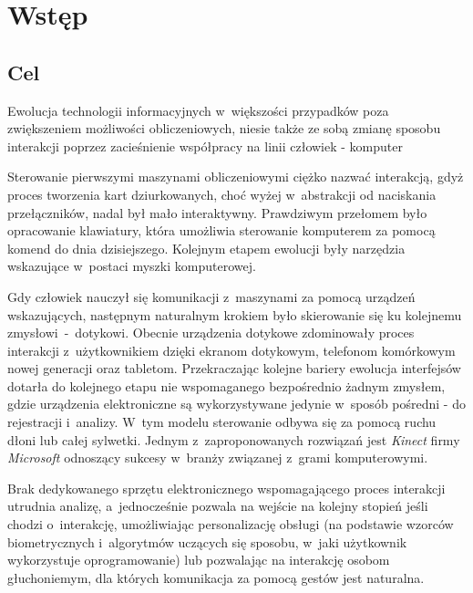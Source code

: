 \chapter{Wstęp}\label{Chapter_Wstep}

  \section{Cel}\label{Section_Aim}

    Ewolucja technologii informacyjnych w~większości przypadków poza zwiększeniem możliwości obliczeniowych, niesie także ze sobą zmianę sposobu interakcji poprzez zacieśnienie współpracy na linii człowiek - komputer

    Sterowanie pierwszymi maszynami obliczeniowymi ciężko nazwać interakcją, gdyż proces tworzenia kart dziurkowanych, choć wyżej w~abstrakcji od naciskania przełączników, nadal był mało interaktywny. Prawdziwym przełomem było opracowanie klawiatury, która umożliwia sterowanie komputerem za pomocą komend do dnia dzisiejszego. Kolejnym etapem ewolucji były narzędzia wskazujące w~postaci myszki komputerowej.

    Gdy człowiek nauczył się komunikacji z~maszynami za pomocą urządzeń wskazujących, następnym naturalnym krokiem było skierowanie się ku kolejnemu zmysłowi~-~dotykowi. Obecnie urządzenia dotykowe zdominowały proces interakcji z~użytkownikiem dzięki ekranom dotykowym, telefonom komórkowym nowej generacji oraz tabletom. Przekraczając kolejne bariery ewolucja interfejsów dotarła do kolejnego etapu nie wspomaganego bezpośrednio żadnym zmysłem, gdzie urządzenia elektroniczne są wykorzystywane jedynie w~sposób pośredni - do rejestracji i~analizy. W~tym modelu sterowanie odbywa się za pomocą ruchu dłoni lub całej sylwetki. Jednym z~zaproponowanych rozwiązań jest \textit{Kinect} firmy \textit{Microsoft} odnoszący sukcesy w~branży związanej z~grami komputerowymi.

    Brak dedykowanego sprzętu elektronicznego wspomagającego proces interakcji utrudnia analizę, a~jednocześnie pozwala na wejście na kolejny stopień jeśli chodzi o~interakcję, umożliwiając personalizację obsługi (na podstawie wzorców biometrycznych i~algorytmów uczących się sposobu, w~jaki użytkownik wykorzystuje oprogramowanie) lub pozwalając na interakcję osobom głuchoniemym, dla których komunikacja za pomocą gestów jest naturalna.


